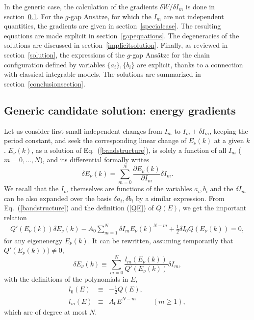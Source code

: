 \documentclass[]{revtex4-1}
\begin{document}
In the generic case, the calculation of the gradients $\delta W/\delta I_m$ is done in section~\ref{genericcase}. For the  $g$-gap Ans\"atze, for which the $I_m$ are not independent quantities, the gradients are given in section~\ref{specialcase}.
The resulting equations are made explicit in section~\ref{gapequations}. The degeneracies of the solutions are discussed in section~\ref{implicitsolution}. Finally, as reviewed in section~\ref{solution}, the expressions of the $g$-gap Ans\"atze for the chain configuration defined by variables $\{a_i\}, \{b_i\}$ are explicit, thanks to a connection with classical integrable models. The solutions are summarized in section~\ref{conclusionsection}.


\subsection{Generic candidate solution: energy gradients}
\label{genericcase}

Let us consider first small independent changes from $I_m$ to $I_m+\delta I_m$, keeping the period constant, and seek the corresponding linear change of $E_{\nu}(k)$ at a given $k$. $E_{\nu}(k)$, as a solution of Eq.~(\ref{bandstructure}), is solely a function of all $I_m$ ($m=0,\dots,N$), and its differential formally writes 
\begin{equation}
\delta E_{\nu}(k) = \sum_{m=0}^N \frac{\partial E_{\nu}(k)}{\partial I_m} \delta I_m.
\end{equation}
We recall that the $I_m$ themselves are functions of the variables $a_i, b_i$ and the $\delta I_m$ can be also expanded over the basis $\delta a_i, \delta b_i$ by a similar expression.
From  Eq.~(\ref{bandstructure}) and the definition (\ref{QE}) of $Q(E)$, we get the important relation
\begin{eqnarray}
Q'(E_{\nu}(k)) \delta E_{\nu}(k) - A_0 \sum_{m=1}^N \delta I_m E_{\nu}(k)^{N-m}+ \frac{1}{2} \delta I_0 Q(E_{\nu}(k)) =0,
\label{deriv}
\end{eqnarray}
for any eigenenergy $E_{\nu}(k)$. It can be rewritten, assuming temporarily that $Q'(E_{\nu}(k))) \neq 0$,
\begin{equation}
 \delta E_{\nu}(k) \equiv \sum_{m=0}^N \frac{l_m(E_{\nu}(k))}{Q'(E_{\nu}(k))} \delta I_m, \label{eqimpo}
\end{equation}
with the definitions of the polynomials in $E$,
\begin{eqnarray}
  l_0(E)& \equiv & -\frac{1}{2} Q(E), \\
  l_m(E) & \equiv & A_0 E^{N-m} \hspace{1cm} (m \geq 1),
\end{eqnarray}
 which are of degree at most $N$.
\end{document}
